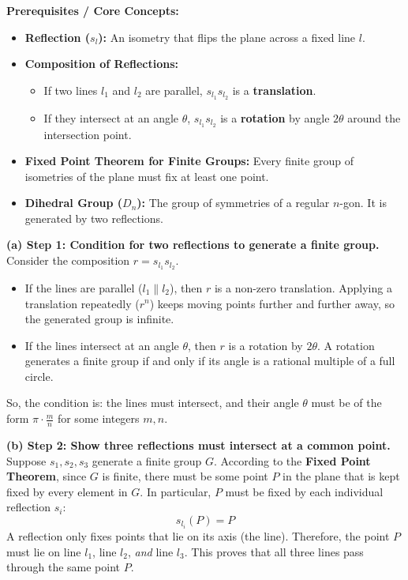 \begin{solution}
\textbf{Prerequisites / Core Concepts:}
\begin{itemize}
    \item \textbf{Reflection ($s_l$):} An isometry that flips the plane across a fixed line $l$.
    \item \textbf{Composition of Reflections:}
    \begin{itemize}
        \item If two lines $l_1$ and $l_2$ are parallel, $s_{l_1} s_{l_2}$ is a \textbf{translation}.
        \item If they intersect at an angle $\theta$, $s_{l_1} s_{l_2}$ is a \textbf{rotation} by angle $2\theta$ around the intersection point.
    \end{itemize}
    \item \textbf{Fixed Point Theorem for Finite Groups:} Every finite group of isometries of the plane must fix at least one point.
    \item \textbf{Dihedral Group ($D_n$):} The group of symmetries of a regular $n$-gon. It is generated by two reflections.
\end{itemize}

\textbf{(a) Step 1: Condition for two reflections to generate a finite group.}
Consider the composition $r = s_{l_1} s_{l_2}$.
\begin{itemize}
    \item If the lines are parallel ($l_1 \parallel l_2$), then $r$ is a non-zero translation. Applying a translation repeatedly ($r^n$) keeps moving points further and further away, so the generated group is infinite.
    \item If the lines intersect at an angle $\theta$, then $r$ is a rotation by $2\theta$. A rotation generates a finite group if and only if its angle is a rational multiple of a full circle.
\end{itemize}
So, the condition is: the lines must intersect, and their angle $\theta$ must be of the form $\pi \cdot \frac{m}{n}$ for some integers $m, n$.

\textbf{(b) Step 2: Show three reflections must intersect at a common point.}
Suppose $s_1, s_2, s_3$ generate a finite group $G$.
According to the \textbf{Fixed Point Theorem}, since $G$ is finite, there must be some point $P$ in the plane that is kept fixed by every element in $G$.
In particular, $P$ must be fixed by each individual reflection $s_i$:
\[ s_{l_i}(P) = P \]
A reflection only fixes points that lie on its axis (the line).
Therefore, the point $P$ must lie on line $l_1$, line $l_2$, \textit{and} line $l_3$. This proves that all three lines pass through the same point $P$.


\end{solution}
